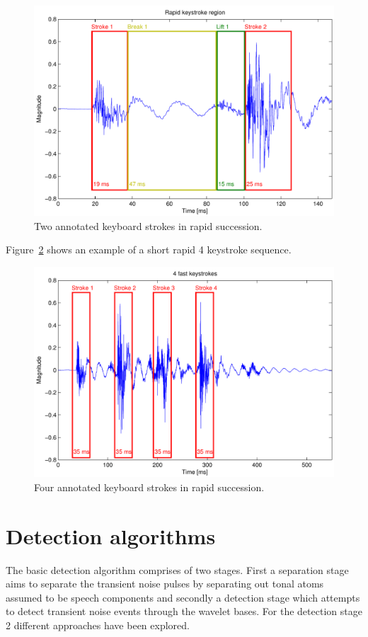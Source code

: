 \begin{figure}[!] %
\centering
\includegraphics[width=120mm]{Keyboard2StrokesFast.pdf}
\caption{Two annotated keyboard strokes in rapid succession.}\label{fig:Keyboard2StrokesFast}
\end{figure}

Figure~\ref{fig:Keyboard4StrokesFast} shows an example of a short rapid 4 keystroke sequence.

\begin{figure}[!] %
\centering
\includegraphics[width=120mm]{Keyboard4StrokesFast.pdf}
\caption{Four annotated keyboard strokes in rapid succession.}\label{fig:Keyboard4StrokesFast}
\end{figure}

\section{Detection algorithms}\label{sec:WPdetection}
The basic detection algorithm comprises of two stages. First a separation stage aims to separate the transient noise pulses by separating out tonal atoms assumed to be speech components and secondly a detection stage which attempts to detect transient noise events through the wavelet bases. For the detection stage 2 different approaches have been explored.

